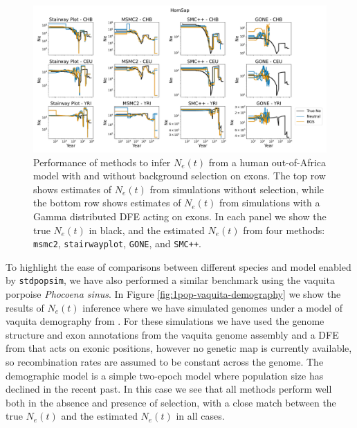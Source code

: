 \documentclass[hidelinks]{article}
\newcommand{\stdpopsim}{\texttt{stdpopsim}\xspace}
\newcommand{\msmc}{\texttt{msmc2}\xspace}
\newcommand{\stairway}{\texttt{stairwayplot}\xspace}
\newcommand{\gone}{\texttt{GONE}\xspace}
\newcommand{\smcpp}{\texttt{SMC++}\xspace}
\begin{document}
    \begin{figure}[t]
        \centering
        \includegraphics[width=\textwidth]{figures/HomSap/OOA/estimated_Ne_t_final}
        \caption{
        \label{fig:1pop-human-demography}
        Performance of methods to infer $N_e(t)$ from a human out-of-Africa model \citep{ragsdale2019models}
        with and without background selection on exons. The top row shows estimates of $N_e(t)$ from simulations
        without selection, while the bottom row shows estimates of $N_e(t)$ from simulations with a Gamma distributed   
        DFE acting on exons. In each panel we show the true $N_e(t)$ in black, and the estimated $N_e(t)$ from four methods:    
        \msmc \citep{Schiffels2020}, \stairway \citep{liu2020stairway}, \gone \citep{santiago2020recent}, and \smcpp \citep{terhorst2017robust}.  
        }
    \end{figure}

    To highlight the ease of comparisons between different species and model enabled by \stdpopsim,
    we have also performed a similar benchmark using the vaquita porpoise \textit{Phocoena sinus}.
    In Figure \ref{fig:1pop-vaquita-demography} we show the results of $N_e(t)$ inference
    where we have simulated genomes under a model of vaquita demography from \textcite{robinson2022critically}.
    For these simulations we have used the genome structure and exon annotations from the vaquita genome assembly
    and a DFE from \textcite{robinson2022critically} that acts on exonic positions, however no genetic map 
    is currently available, so recombination rates are assumed to be constant across the genome.
    The demographic model is a simple two-epoch model where population size has declined in the recent past. 
    In this case we see that all methods perform well both in the absence and presence of selection,
    with a close match between the true $N_e(t)$ and the estimated $N_e(t)$ in all cases.
\end{document}

